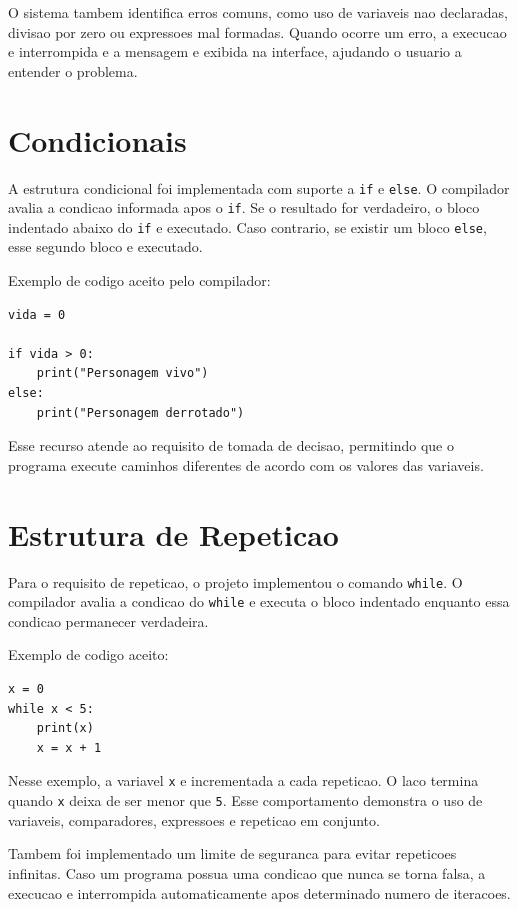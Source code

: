 \documentclass[12pt,a4paper]{article}
\begin{document}
O sistema tambem identifica erros comuns, como uso de variaveis nao declaradas, divisao por zero ou expressoes mal formadas. Quando ocorre um erro, a execucao e interrompida e a mensagem e exibida na interface, ajudando o usuario a entender o problema.

\section{Condicionais}

A estrutura condicional foi implementada com suporte a \texttt{if} e \texttt{else}. O compilador avalia a condicao informada apos o \texttt{if}. Se o resultado for verdadeiro, o bloco indentado abaixo do \texttt{if} e executado. Caso contrario, se existir um bloco \texttt{else}, esse segundo bloco e executado.

Exemplo de codigo aceito pelo compilador:

\begin{lstlisting}
vida = 0

if vida > 0:
    print("Personagem vivo")
else:
    print("Personagem derrotado")
\end{lstlisting}

Esse recurso atende ao requisito de tomada de decisao, permitindo que o programa execute caminhos diferentes de acordo com os valores das variaveis.

\section{Estrutura de Repeticao}

Para o requisito de repeticao, o projeto implementou o comando \texttt{while}. O compilador avalia a condicao do \texttt{while} e executa o bloco indentado enquanto essa condicao permanecer verdadeira.

Exemplo de codigo aceito:

\begin{lstlisting}
x = 0
while x < 5:
    print(x)
    x = x + 1
\end{lstlisting}

Nesse exemplo, a variavel \texttt{x} e incrementada a cada repeticao. O laco termina quando \texttt{x} deixa de ser menor que \texttt{5}. Esse comportamento demonstra o uso de variaveis, comparadores, expressoes e repeticao em conjunto.

Tambem foi implementado um limite de seguranca para evitar repeticoes infinitas. Caso um programa possua uma condicao que nunca se torna falsa, a execucao e interrompida automaticamente apos determinado numero de iteracoes.
\end{document}
